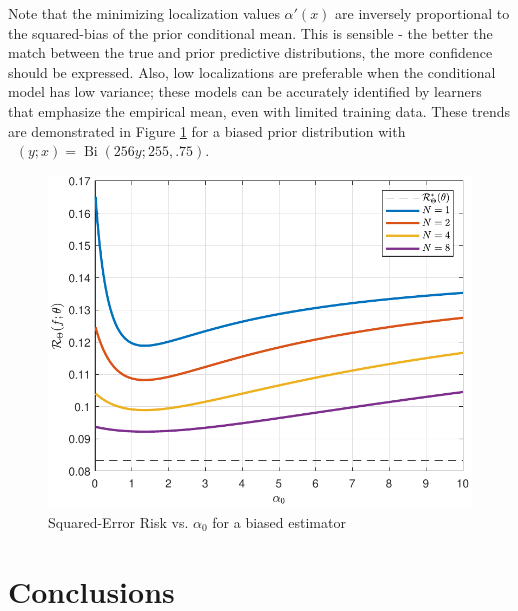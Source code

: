 \documentclass{article}
\DeclareMathOperator{\Bi}{\mathrm{Bi}}
\DeclareMathOperator{\alpham}{\alpha_\text{m}}
\DeclareMathOperator{\alphac}{\alpha_\text{c}}
\begin{document}
Note that the minimizing localization values $\alpha'(x)$ are inversely proportional to the squared-bias of the prior conditional mean. This is sensible - the better the match between the true and prior predictive distributions, the more confidence should be expressed. Also, low localizations are preferable when the conditional model has low variance; these models can be accurately identified by learners that emphasize the empirical mean, even with limited training data. These trends are demonstrated in Figure  \ref{fig:Risk_cond_SE_Dir_a0_leg_N_biased} for a biased prior distribution with $\alphac(y;x) = \Bi(256y;255,.75)$.
\begin{figure}
	\centering
	\includegraphics[width=0.95\linewidth]{Risk_cond_SE_Dir_a0_leg_N_biased_SSP.pdf}
	\caption{Squared-Error Risk vs. $\alpha_0$ for a biased estimator}
	\label{fig:Risk_cond_SE_Dir_a0_leg_N_biased}
\end{figure}







\section{Conclusions}
\end{document}
